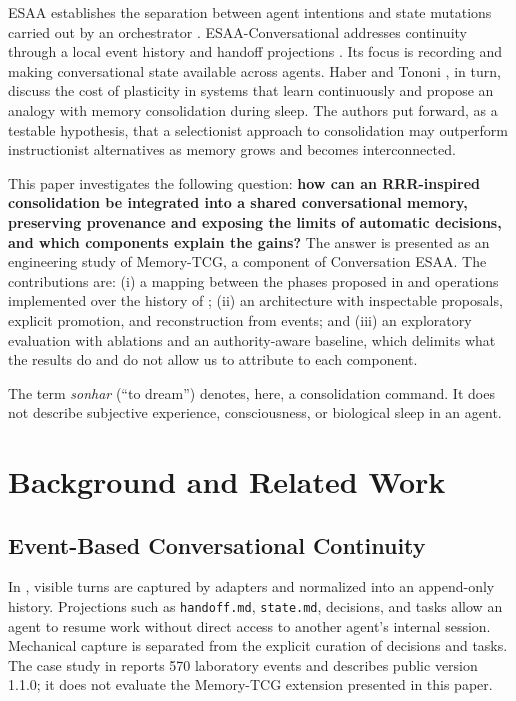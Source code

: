 \documentclass[11pt,a4paper]{article}
\begin{document}
ESAA establishes the separation between agent intentions and state mutations carried out by an orchestrator \cite{ref3}. ESAA-Conversational addresses continuity through a local event history and handoff projections \cite{ref1}. Its focus is recording and making conversational state available across agents. Haber and Tononi \cite{ref2}, in turn, discuss the cost of plasticity in systems that learn continuously and propose an analogy with memory consolidation during sleep. The authors put forward, as a testable hypothesis, that a selectionist approach to consolidation may outperform instructionist alternatives as memory grows and becomes interconnected.

This paper investigates the following question: \textbf{how can an RRR-inspired consolidation be integrated into a shared conversational memory, preserving provenance and exposing the limits of automatic decisions, and which components explain the gains?} The answer is presented as an engineering study of Memory-TCG, a component of Conversation ESAA. The contributions are: (i) a mapping between the phases proposed in \cite{ref2} and operations implemented over the history of \cite{ref1}; (ii) an architecture with inspectable proposals, explicit promotion, and reconstruction from events; and (iii) an exploratory evaluation with ablations and an authority-aware baseline, which delimits what the results do and do not allow us to attribute to each component.

The term \emph{sonhar} (``to dream'') denotes, here, a consolidation command. It does not describe subjective experience, consciousness, or biological sleep in an agent.

\section{Background and Related Work}\label{sec:2}
\subsection{Event-Based Conversational Continuity}\label{sec:2.1}
In \cite{ref1}, visible turns are captured by adapters and normalized into an append-only history. Projections such as \texttt{handoff.md}, \texttt{state.md}, decisions, and tasks allow an agent to resume work without direct access to another agent's internal session. Mechanical capture is separated from the explicit curation of decisions and tasks. The case study in \cite{ref1} reports 570 laboratory events and describes public version 1.1.0; it does not evaluate the Memory-TCG extension presented in this paper.
\end{document}
